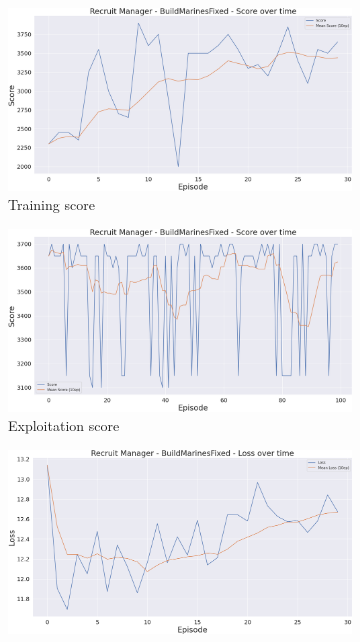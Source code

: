 \begin{figure}[h]
    \centering
    \begin{subfigure}[b]{0.495\textwidth}
        \includegraphics[width=1\textwidth]{figs/multi_dqn_army_recruit_manager/score.png}
        \caption{Training score}
    \end{subfigure}
    \begin{subfigure}[b]{0.495\textwidth}
        \includegraphics[width=1\textwidth]{figs/multi_dqn_army_recruit_manager/exploit/score.png}
        \caption{Exploitation score}
    \end{subfigure}
    \begin{subfigure}[b]{0.495\textwidth}
        \includegraphics[width=1\textwidth]{figs/multi_dqn_army_recruit_manager/loss.png}

\end{subfigure}
\end{figure}
